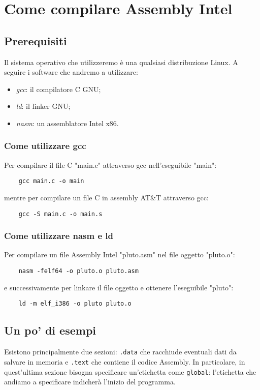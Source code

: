 \documentclass[class=book, crop=false, oneside]{standalone}
\begin{document}
\chapter{Come compilare Assembly Intel}

\section{Prerequisiti}
Il sistema operativo che utilizzeremo è una qualsiasi distribuzione Linux. A seguire i software che andremo a utilizzare:
\begin{itemize}
	\item \emph{gcc}: il compilatore C GNU;
	\item \emph{ld}: il linker GNU;
	\item \emph{nasm}: un assemblatore Intel x86.
\end{itemize}

\subsection{Come utilizzare gcc}
Per compilare il file C "main.c" attraverso gcc nell'eseguibile "main":
\begin{verbatim}
	gcc main.c -o main
\end{verbatim}
mentre per compilare un file C in assembly AT\&T attraverso gcc:
\begin{verbatim}
	gcc -S main.c -o main.s
\end{verbatim}

\subsection{Come utilizzare nasm e ld}
Per compilare un file Assembly Intel "pluto.asm" nel file oggetto "pluto.o":
\begin{verbatim}
	nasm -felf64 -o pluto.o pluto.asm
\end{verbatim}
e successivamente per linkare il file oggetto e ottenere l'eseguibile "pluto":
\begin{verbatim}
	ld -m elf_i386 -o pluto pluto.o
\end{verbatim}

\section{Un po' di esempi}
Esistono principalmente due sezioni: \texttt{.data} che racchiude eventuali dati da salvare in memoria e \texttt{.text} che contiene il codice Assembly. In particolare, in quest'ultima sezione bisogna specificare un'etichetta come \texttt{global}: l'etichetta che andiamo a specificare indicherà l'inizio del programma.
\end{document}
